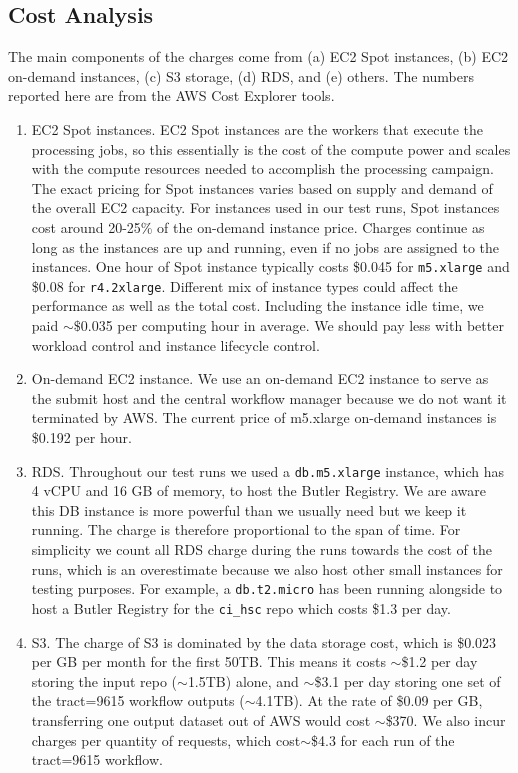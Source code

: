\subsection{Cost Analysis}

The main components of the charges come from (a) EC2 Spot instances, (b) EC2 on-demand instances, (c) S3 storage, (d) RDS, and (e) others.
The numbers reported here are from the AWS Cost Explorer tools.

\begin{enumerate}
\item EC2 Spot instances.
EC2 Spot instances are the workers that execute the processing jobs, so this essentially is the cost of the compute power and scales with the compute resources needed to accomplish the processing campaign.
The exact pricing for Spot instances varies based on supply and demand of the overall EC2 capacity.
For instances used in our test runs, Spot instances cost around 20-25\% of the on-demand instance price.
Charges continue as long as the instances are up and running, even if no jobs are assigned to the instances.
One hour of Spot instance typically costs \$0.045 for \texttt{m5.xlarge} and \$0.08 for \texttt{r4.2xlarge}.
Different mix of instance types could affect the performance as well as the total cost.
Including the instance idle time, we paid $\sim\$$0.035 per computing hour in average.
We should pay less with better workload control and instance lifecycle control.

\item On-demand EC2 instance.
We use an on-demand EC2 instance to serve as the submit host and the central workflow manager because we do not want it terminated by AWS.
The current price of m5.xlarge on-demand instances is \$0.192 per hour.

\item RDS.
Throughout our test runs we used a \texttt{db.m5.xlarge} instance, which has 4 vCPU and 16 GB of memory, to host the Butler Registry.
We are aware this DB instance is more powerful than we usually need but we keep it running.
The charge is therefore proportional to the span of time.
For simplicity we count all RDS charge during the runs towards the cost of the runs, which is an overestimate because we also host other small instances for testing purposes.
For example, a \texttt{db.t2.micro} has been running alongside to host a Butler Registry for the \texttt{ci\_hsc} repo which costs \$1.3 per day.

\item S3.
The charge of S3 is dominated by the data storage cost, which is \$0.023 per GB per month for the first 50TB.
This means it costs $\sim$\$1.2 per day storing the input repo ($\sim$1.5TB) alone, and $\sim$\$3.1 per day storing one set of the tract=9615 workflow outputs ($\sim$4.1TB).
At the rate of \$0.09 per GB, transferring one output dataset out of AWS would cost $\sim$\$370.
We also incur charges per quantity of requests, which cost$\sim$\$4.3 for each run of the tract=9615 workflow.


\end{enumerate}
